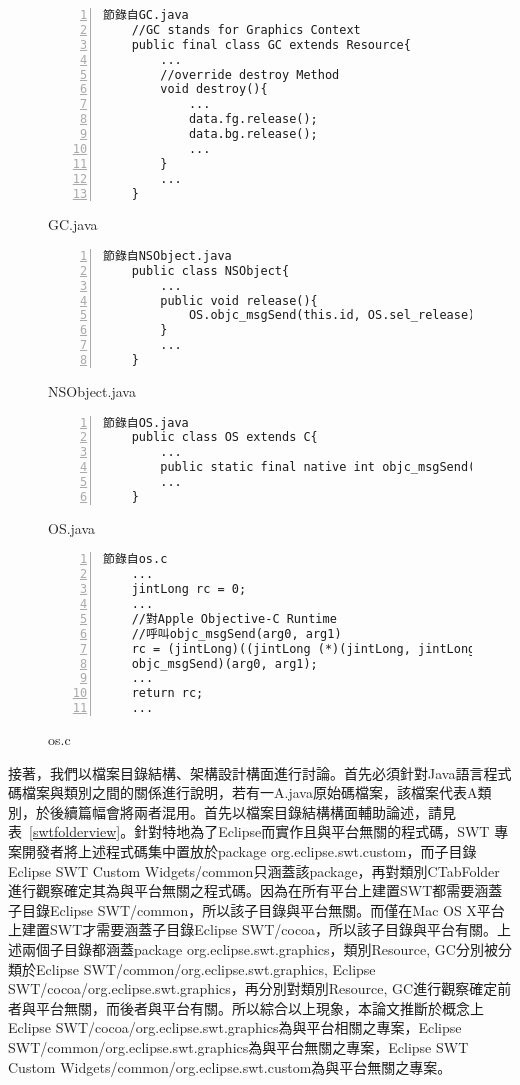 \begin{figure}
\linespread{0.8}
\begin{Verbatim}[numbers=left,framesep=1mm,numbersep=-12pt]
	節錄自GC.java
	//GC stands for Graphics Context
	public final class GC extends Resource{
		...
		//override destroy Method
		void destroy(){
			...
			data.fg.release();
			data.bg.release();
			...
		}
		...
	}
\end{Verbatim}
\caption{GC.java}
\label{gc}
\end{figure}


\begin{figure}
\linespread{0.8}
\begin{Verbatim}[numbers=left,framesep=1mm,numbersep=-12pt]
	節錄自NSObject.java
	public class NSObject{
		...
		public void release(){
			OS.objc_msgSend(this.id, OS.sel_release);
		}
		...
	}
\end{Verbatim}
\caption{NSObject.java}
\label{nsobject}
\end{figure}

\begin{figure}
\linespread{0.8}
\begin{Verbatim}[numbers=left,framesep=1mm,numbersep=-12pt]
	節錄自OS.java
	public class OS extends C{
		...
		public static final native int objc_msgSend(int id, int sel);
		...
	}
\end{Verbatim}
\caption{OS.java}
\label{os}
\end{figure}

\begin{figure}
\linespread{0.8}
\begin{Verbatim}[numbers=left,framesep=1mm,numbersep=-12pt]
	節錄自os.c
	...
	jintLong rc = 0;
	...
	//對Apple Objective-C Runtime
	//呼叫objc_msgSend(arg0, arg1) 
	rc = (jintLong)((jintLong (*)(jintLong, jintLong))
	objc_msgSend)(arg0, arg1);
	...
	return rc;
	...
\end{Verbatim}
\caption{os.c}
\label{osc}
\end{figure}

接著，我們以檔案目錄結構、架構設計構面進行討論。首先必須針對Java語言程式碼檔案與類別之間的關係進行說明，若有一A.java原始碼檔案，該檔案代表A類別，於後續篇幅會將兩者混用。首先以檔案目錄結構構面輔助論述，請見表~\ref{swtfolderview}。針對特地為了Eclipse而實作且與平台無關的程式碼，SWT 專案開發者將上述程式碼集中置放於package org.eclipse.swt.custom\cite{swtbook}，而子目錄Eclipse SWT Custom Widgets/common只涵蓋該package，再對類別CTabFolder進行觀察確定其為與平台無關之程式碼。因為在所有平台上建置SWT都需要涵蓋子目錄Eclipse SWT/common，所以該子目錄與平台無關。而僅在Mac OS X平台上建置SWT才需要涵蓋子目錄Eclipse SWT/cocoa，所以該子目錄與平台有關。上述兩個子目錄都涵蓋package org.eclipse.swt.graphics，類別Resource, GC分別被分類於Eclipse SWT/common/org.eclipse.swt.graphics, Eclipse SWT/cocoa/org.eclipse.swt.graphics，再分別對類別Resource, GC進行觀察確定前者與平台無關，而後者與平台有關。所以綜合以上現象，本論文推斷於概念上Eclipse SWT/cocoa/org.eclipse.swt.graphics為與平台相關之專案，Eclipse SWT/common/org.eclipse.swt.graphics為與平台無關之專案，Eclipse SWT Custom Widgets/common/org.eclipse.swt.custom為與平台無關之專案。


